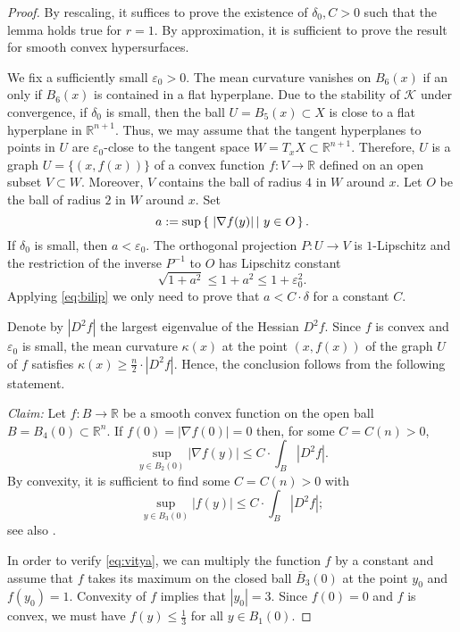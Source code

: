\documentclass[12pt,leqno,intlimits]{amsart}
\numberwithin{equation}{section}
\theoremstyle{definition}
\theoremstyle{remark}
\newcommand{\R}{\mathbb{R}}
\def\:{\colon}
\newcommand*{\set}[2]{\left\{\,\left.{#1}\vphantom{#2}\,\right|\,{#2}\,\right\}}
\begin{document}
\begin{proof}
By rescaling, it suffices to prove the existence of $\delta _0, C>0$ such that the lemma holds true for $r=1$.
By approximation, it is sufficient to prove the result for smooth convex hypersurfaces.

We fix a sufficiently small $\varepsilon _0>0$. The mean curvature vanishes on $B_6 (x)$ if an only if $B_6(x)$ is contained in a flat hyperplane.
Due to the stability of $\mathcal K$ under convergence, if $\delta_0$ is small, then
the ball $U=B_{5} (x) \subset X$ is close to a flat hyperplane in $\R^{n+1}$.
Thus, we may assume that the tangent hyperplanes to points in $U$ are $\varepsilon_0$-close to the tangent
space $W =T_xX \subset \R^{n+1}$. Therefore, $U$ is a graph $U=\{(x,f(x))\}$ of a convex function $f\:V\to \R$ defined on an open subset $V\subset W$. Moreover, $V$ contains the ball of radius $4$ in $W$ around $x$. Let $O$
be the ball of radius $2$ in $W$ around $x$. 
Set
$$a :=\sup \set{|\nabla f (y)|}{y\in O}.$$
If $\delta _0$ is small, then $a<\varepsilon_0$.
The orthogonal projection $P\:U\to V$ is $1$-Lipschitz and the restriction of the inverse $P^{-1}$ to $O$ has Lipschitz constant $$\sqrt {1+ a^2} \leq 1+a^2 \leq 1+\varepsilon_0 ^2.$$
Applying \eqref{eq:bilip} we only need to prove that $a < C \cdot \delta $ for a constant $C$.

Denote by $|D^2f|$ the largest eigenvalue of the Hessian $D^2f$.
Since $f$ is convex and $\varepsilon _0$ is small, the mean curvature $\mathcal \kappa (x)$ at the point $(x,f(x))$ of the graph $U$ of $f$ satisfies $\kappa (x) \geq \frac n 2 \cdot |D^2 f|$. Hence, the conclusion follows from the following statement.

\emph{Claim:} Let $f:B \to \R$ be a smooth convex function on the open ball $B=B_4 (0)\subset \R^n$.
If $f(0)=|\nabla f(0)| =0$ then, for some $C=C(n)>0$,
$$\sup_{y\in B_2 (0)} |\nabla f (y)| \leq C\cdot \int _{B} |D^2f|.$$
By convexity, it is sufficient to find some $C=C(n)>0$ with
\begin{equation} \label{eq:vitya}
\sup _{y\in B_3 (0) }| f(y)| \leq C \cdot \int _{B} |D^2f|;
\end{equation}
see also \cite[Theorem 6.7]{Evans}.

In order to verify \eqref{eq:vitya}, we can multiply the function $f$ by a constant and assume that
$f$ takes its maximum on the closed ball $\bar B_3 (0)$ at the point $y_0$ and $f(y_0)=1$.
Convexity of $f$ implies that $|y_0|=3$.
Since $f(0)=0$ and $f$ is convex, we must have $f(y)\leq \frac 1 3$ for all $y\in B_1(0)$.


\end{proof}
\end{document}

